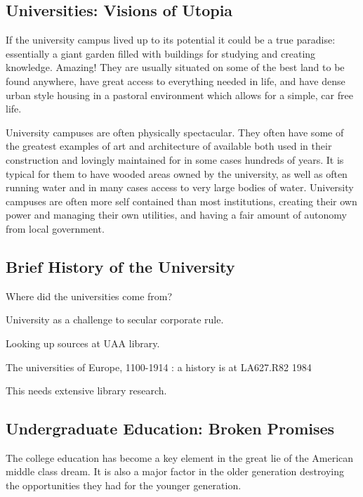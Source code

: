 \subsection{Universities: Visions of
Utopia}\label{universities-visions-of-utopia}

If the university campus lived up to its potential it could be a true
paradise: essentially a giant garden filled with buildings for studying
and creating knowledge. Amazing! They are usually situated on some of
the best land to be found anywhere, have great access to everything
needed in life, and have dense urban style housing in a pastoral
environment which allows for a simple, car free life.

University campuses are often physically spectacular. They often have
some of the greatest examples of art and architecture of available both
used in their construction and lovingly maintained for in some cases
hundreds of years. It is typical for them to have wooded areas owned by
the university, as well as often running water and in many cases access
to very large bodies of water. University campuses are often more self
contained than most institutions, creating their own power and managing
their own utilities, and having a fair amount of autonomy from local
government.

\subsection{Brief History of the
University}\label{brief-history-of-the-university}

Where did the universities come from?

University as a challenge to secular corporate rule.

Looking up sources at UAA library.

The universities of Europe, 1100-1914 : a history is at LA627.R82 1984

This needs extensive library research.

\subsection{Undergraduate Education: Broken
Promises}\label{undergraduate-education-broken-promises}

The college education has become a key element in the great lie of the
American middle class dream. It is also a major factor in the older
generation destroying the opportunities they had for the younger
generation.

